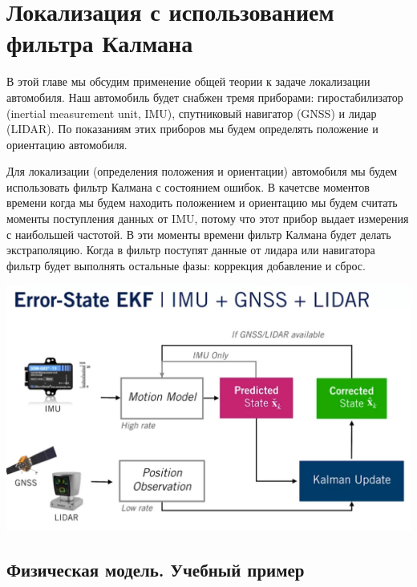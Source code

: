 \documentclass[12pt]{article}
\begin{document}
\section{Локализация с использованием фильтра Калмана}
\label{SectionLocalizationWothKalmanFilter}

В этой главе мы обсудим применение общей теории к задаче локализации автомобиля.
Наш автомобиль будет снабжен тремя приборами: гиростабилизатор
(inertial measurement unit, IMU), спутниковый навигатор (GNSS) и лидар (LIDAR).
По показаниям этих приборов мы будем определять положение и ориентацию автомобиля.

Для локализации (определения положения и ориентации) автомобиля мы будем использовать
фильтр Калмана с состоянием ошибок. В качетсве моментов времени когда мы будем
находить положением и ориентацию мы будем считать моменты поступления данных от
IMU, потому что этот прибор выдает измерения с наибольшей частотой. В эти моменты
времени фильтр Калмана будет делать экстраполяцию. Когда в фильтр поступят данные от
лидара или навигатора фильтр будет выполнять остальные фазы: коррекция добавление
и сброс.

\begin{center}
    \includegraphics[scale=0.3]{eskf_pipeline.jpg}
\end{center}


\subsection{Физическая модель. Учебный пример}
\label{SubsectionPhysicalModelWarmup}
\end{document}
